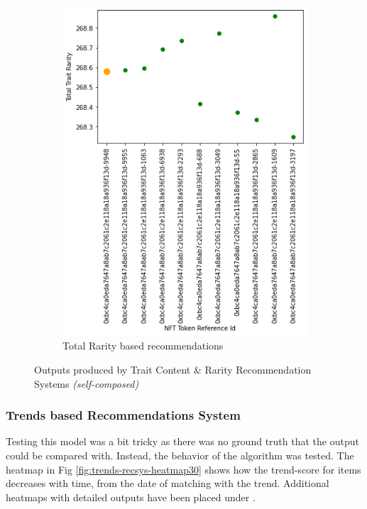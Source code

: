 \begin{figure}[h!]
\begin{subfigure}[b]{0.45\textwidth}
         \includegraphics[width=\textwidth]{images/Testing/trait/Trait rarity representation graph - rarity recommendations.png}
         \caption{Total Rarity based recommendations}
         \label{fig:total-rarity-output}
     \end{subfigure}
     \hfill
        \caption{Outputs produced by Trait Content \& Rarity Recommendation Systems \textit{(self-composed)}}
        \label{fig:trait-recs-outputs}
\end{figure}



\vspace{-5mm}
\subsubsection{Trends based Recommendations System}

Testing this model was a bit tricky as there was no ground truth that the output could be compared with. Instead, the behavior of the algorithm was tested.
The heatmap in Fig \ref{fig:trends-recsys-heatmap30} shows how the trend-score for items decreases with time, from the date of matching with the trend. Additional heatmaps with detailed outputs have been placed under \textit{}.

